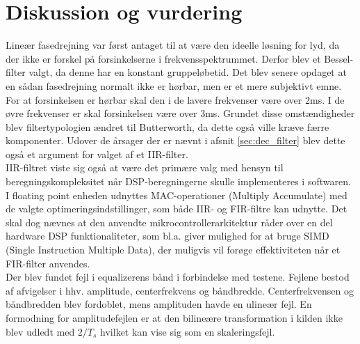 \chapter{Diskussion og vurdering}\label{kap:diskussion}
\vspace*{.5cm}


Lineær fasedrejning var først antaget til at være den ideelle løsning for lyd, da der ikke er forskel på forsinkelserne i frekvensspektrummet. Derfor blev et Bessel-filter valgt, da denne har en konstant gruppeløbetid. 
Det blev senere opdaget at en sådan fasedrejning normalt ikke er hørbar, men er et mere subjektivt emne. \\
For at forsinkelsen er hørbar skal den i de lavere frekvenser være over 2ms. 
I de øvre frekvenser er skal forsinkelsen være over 3ms.
Grundet disse omstændigheder blev filtertypologien ændret til Butterworth, da dette også ville kræve færre komponenter. 
Udover de årsager der er nævnt i afsnit \ref{sec:dec_filter} blev dette også et argument for valget af et IIR-filter. \\


IIR-filtret viste sig også at være det primære valg med hensyn til beregningskompleksitet når DSP-beregningerne skulle implementeres i softwaren.
I floating point enheden udnyttes MAC-operationer (Multiply Accumulate) med de valgte optimeringsindstillinger, som både IIR- og FIR-filtre kan udnytte.
Det skal dog nævnes at den anvendte mikrocontrollerarkitektur råder over en del hardware DSP funktionaliteter, som bl.a. giver mulighed for at bruge SIMD (Single Instruction Multiple Data), der muligvis vil forøge effektiviteten når et FIR-filter anvendes. \\


Der blev fundet fejl i equalizerens bånd i forbindelse med testene. 
Fejlene bestod af afvigelser i hhv. amplitude, centerfrekvens og båndbredde. 
Centerfrekvensen og båndbredden blev fordoblet, mens amplituden havde en ulineær fejl. 
En formodning for amplitudefejlen er at den bilineære transformation i kilden ikke blev udledt med $2/T_s$ hvilket kan vise sig som en skaleringsfejl.\\

